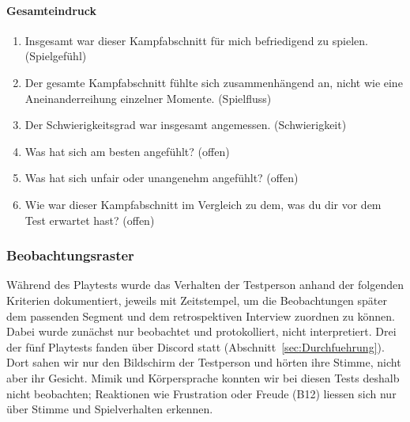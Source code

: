\documentclass[../Main.tex]{subfiles}
\begin{document}
\paragraph{Gesamteindruck}
\begin{enumerate}[label=\textbf{Q\arabic*}, leftmargin=1.5cm, itemsep=0.5em, resume]
    \item Insgesamt war dieser Kampfabschnitt für mich befriedigend zu spielen. \hfill (Spielgefühl)
    \item Der gesamte Kampfabschnitt fühlte sich zusammenhängend an, nicht wie eine Aneinanderreihung einzelner Momente. \hfill (Spielfluss)
    \item Der Schwierigkeitsgrad war insgesamt angemessen. \hfill (Schwierigkeit)
    \item Was hat sich am besten angefühlt? \hfill (offen)
    \item Was hat sich unfair oder unangenehm angefühlt? \hfill (offen)
    \item Wie war dieser Kampfabschnitt im Vergleich zu dem, was du dir vor dem Test erwartet hast? \hfill (offen)
\end{enumerate}

\subsubsection{Beobachtungsraster} \label{sec:Beobachtungsraster}

Während des Playtests wurde das Verhalten der Testperson anhand der folgenden Kriterien dokumentiert, jeweils mit Zeitstempel, um die Beobachtungen später dem passenden Segment und dem retrospektiven Interview zuordnen zu können. Dabei wurde zunächst nur beobachtet und protokolliert, nicht interpretiert. Drei der fünf Playtests fanden über Discord statt (Abschnitt~\ref{sec:Durchfuehrung}). Dort sahen wir nur den Bildschirm der Testperson und hörten ihre Stimme, nicht aber ihr Gesicht. Mimik und Körpersprache konnten wir bei diesen Tests deshalb nicht beobachten; Reaktionen wie Frustration oder Freude (B12) liessen sich nur über Stimme und Spielverhalten erkennen.
\end{document}

